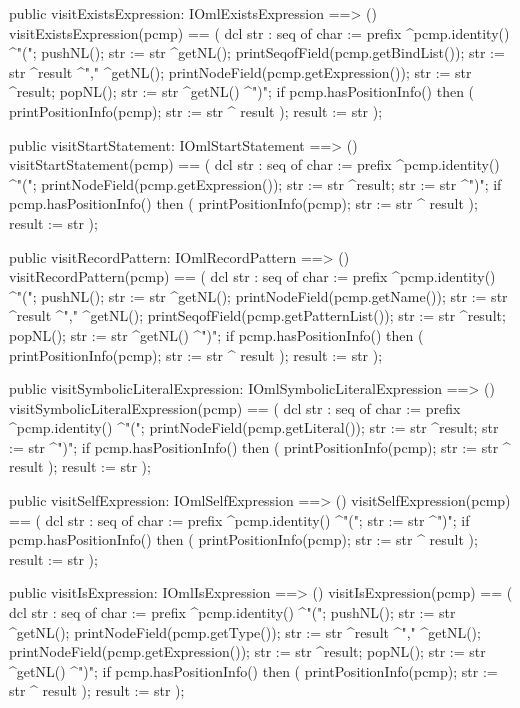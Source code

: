\begin{vdm_al}
  public visitExistsExpression: IOmlExistsExpression ==> ()
  visitExistsExpression(pcmp) ==
    ( dcl str : seq of char := prefix ^pcmp.identity() ^"(";
      pushNL();
      str := str ^getNL();
      printSeqofField(pcmp.getBindList());
      str := str ^result ^"," ^getNL();
      printNodeField(pcmp.getExpression());
      str := str ^result;
      popNL();
      str := str ^getNL() ^")";
      if pcmp.hasPositionInfo()
      then ( printPositionInfo(pcmp);
             str := str ^ result );
      result := str );

  public visitStartStatement: IOmlStartStatement ==> ()
  visitStartStatement(pcmp) ==
    ( dcl str : seq of char := prefix ^pcmp.identity() ^"(";
      printNodeField(pcmp.getExpression());
      str := str ^result;
      str := str ^")";
      if pcmp.hasPositionInfo()
      then ( printPositionInfo(pcmp);
             str := str ^ result );
      result := str );

  public visitRecordPattern: IOmlRecordPattern ==> ()
  visitRecordPattern(pcmp) ==
    ( dcl str : seq of char := prefix ^pcmp.identity() ^"(";
      pushNL();
      str := str ^getNL();
      printNodeField(pcmp.getName());
      str := str ^result ^"," ^getNL();
      printSeqofField(pcmp.getPatternList());
      str := str ^result;
      popNL();
      str := str ^getNL() ^")";
      if pcmp.hasPositionInfo()
      then ( printPositionInfo(pcmp);
             str := str ^ result );
      result := str );

  public visitSymbolicLiteralExpression: IOmlSymbolicLiteralExpression ==> ()
  visitSymbolicLiteralExpression(pcmp) ==
    ( dcl str : seq of char := prefix ^pcmp.identity() ^"(";
      printNodeField(pcmp.getLiteral());
      str := str ^result;
      str := str ^")";
      if pcmp.hasPositionInfo()
      then ( printPositionInfo(pcmp);
             str := str ^ result );
      result := str );

  public visitSelfExpression: IOmlSelfExpression ==> ()
  visitSelfExpression(pcmp) ==
    ( dcl str : seq of char := prefix ^pcmp.identity() ^"(";
      str := str ^")";
      if pcmp.hasPositionInfo()
      then ( printPositionInfo(pcmp);
             str := str ^ result );
      result := str );

  public visitIsExpression: IOmlIsExpression ==> ()
  visitIsExpression(pcmp) ==
    ( dcl str : seq of char := prefix ^pcmp.identity() ^"(";
      pushNL();
      str := str ^getNL();
      printNodeField(pcmp.getType());
      str := str ^result ^"," ^getNL();
      printNodeField(pcmp.getExpression());
      str := str ^result;
      popNL();
      str := str ^getNL() ^")";
      if pcmp.hasPositionInfo()
      then ( printPositionInfo(pcmp);
             str := str ^ result );
      result := str );


\end{vdm_al}
